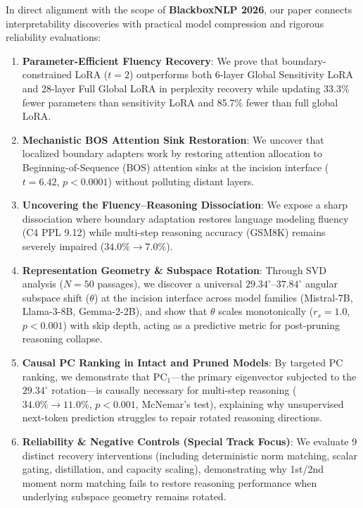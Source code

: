 \documentclass[11pt]{article}
\begin{document}
In direct alignment with the scope of \textbf{BlackboxNLP 2026}, our paper connects interpretability discoveries with practical model compression and rigorous reliability evaluations:
\begin{enumerate}
    \item \textbf{Parameter-Efficient Fluency Recovery}: We prove that boundary-constrained LoRA ($t=2$) outperforms both 6-layer Global Sensitivity LoRA and 28-layer Full Global LoRA in perplexity recovery while updating 33.3\% fewer parameters than sensitivity LoRA and 85.7\% fewer than full global LoRA.
    \item \textbf{Mechanistic BOS Attention Sink Restoration}: We uncover that localized boundary adapters work by restoring attention allocation to Beginning-of-Sequence (BOS) attention sinks \citep{xiao2023efficient} at the incision interface ($t=6.42$, $p < 0.0001$) without polluting distant layers.
    \item \textbf{Uncovering the Fluency--Reasoning Dissociation}: We expose a sharp dissociation where boundary adaptation restores language modeling fluency (C4 PPL 9.12) while multi-step reasoning accuracy (GSM8K) remains severely impaired ($34.0\% \!\to\! 7.0\%$).
    \item \textbf{Representation Geometry \& Subspace Rotation}: Through SVD analysis ($N=50$ passages), we discover a universal $29.34^\circ$--$37.84^\circ$ angular subspace shift ($\theta$) at the incision interface across model families (Mistral-7B, Llama-3-8B, Gemma-2-2B), and show that $\theta$ scales monotonically ($r_s = 1.0$, $p < 0.001$) with skip depth, acting as a predictive metric for post-pruning reasoning collapse.
    \item \textbf{Causal PC Ranking in Intact and Pruned Models}: By targeted PC ranking, we demonstrate that $\mathrm{PC}_1$---the primary eigenvector subjected to the $29.34^\circ$ rotation---is causally necessary for multi-step reasoning ($34.0\% \!\to\! 11.0\%$, $p < 0.001$, McNemar's test), explaining why unsupervised next-token prediction struggles to repair rotated reasoning directions.
    \item \textbf{Reliability \& Negative Controls (Special Track Focus)}: We evaluate 9 distinct recovery interventions (including deterministic norm matching, scalar gating, distillation, and capacity scaling), demonstrating why 1st/2nd moment norm matching fails to restore reasoning performance when underlying subspace geometry remains rotated.
\end{enumerate}
\end{document}
